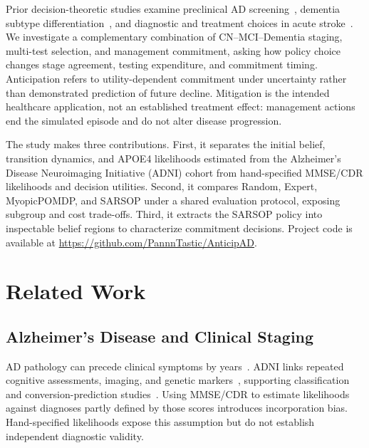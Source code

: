 \documentclass[conference,a4paper]{IEEEtran}
\begin{document}
Prior decision-theoretic studies examine preclinical AD
screening~\cite{onendumlu}, dementia subtype
differentiation~\cite{navarro}, and diagnostic and treatment choices
in acute stroke~\cite{khatim}. We investigate a complementary
combination of CN--MCI--Dementia staging, multi-test selection, and
management commitment, asking how policy choice changes stage
agreement, testing expenditure, and commitment timing.
Anticipation refers to utility-dependent commitment under uncertainty
rather than demonstrated prediction of future decline. Mitigation
is the intended healthcare application, not an established treatment
effect: management actions end the simulated episode and do not
alter disease progression.

The study makes three contributions. First, it separates the initial
belief, transition dynamics, and APOE4 likelihoods estimated from the
Alzheimer's Disease Neuroimaging Initiative (ADNI) cohort
from hand-specified MMSE/CDR likelihoods and decision utilities.
Second, it compares Random, Expert, MyopicPOMDP, and SARSOP under
a shared evaluation protocol, exposing subgroup and cost trade-offs.
Third, it extracts the SARSOP policy into inspectable belief regions
to characterize commitment decisions. Project code is available at
\url{https://github.com/PannnTastic/AnticipAD}.

\section{Related Work}

\subsection{Alzheimer's Disease and Clinical Staging}
\label{subsec:ad}
AD pathology can precede clinical symptoms by
years~\cite{jack2010hypothetical,sperling2011preclinical}.
ADNI links repeated cognitive assessments, imaging, and genetic
markers~\cite{petersen2010adni,jack2008adni,mueller2005adni}, supporting
classification and conversion-prediction
studies~\cite{wen2020convolutional,grueso2021machine}.
Using MMSE/CDR to estimate likelihoods against diagnoses partly
defined by those scores introduces incorporation bias.
Hand-specified likelihoods expose this assumption but do not
establish independent diagnostic validity.
\end{document}
